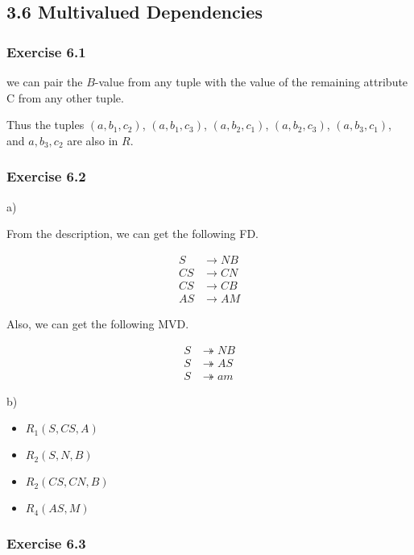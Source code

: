 \documentclass[../../main.tex]{subfiles}
\begin{document}
\subsection*{3.6 Multivalued Dependencies}

\subsubsection*{Exercise 6.1}

we can pair the $B$-value from any tuple with the
value of the remaining attribute C from any other
tuple.

Thus the tuples $(a, b_{1}, c_{2})$, $(a, b_{1}, c_{3})$,
$(a, b_{2}, c_{1})$, $(a, b_{2}, c_{3})$, $(a, b_{3}, c_{1})$,
and $a, b_{3}, c_{2}$ are also in $R$.

\subsubsection*{Exercise 6.2}

a)

From the description, we can get the following FD.

\begin{align*}
  S & \to NB \\
  CS & \to CN \\
  CS & \to CB \\
  AS & \to AM
\end{align*}

Also, we can get the following MVD.

\begin{align*}
  S & \twoheadrightarrow NB \\
  S & \twoheadrightarrow AS \\
  S & \twoheadrightarrow am
\end{align*}

b)

\begin{itemize}
  \item $R_{1}(S, CS, A)$
  \item $R_{2}(S,N,B)$
  \item $R_{2}(CS,CN,B)$
  \item $R_{4}(AS, M)$
\end{itemize}

\subsubsection*{Exercise 6.3}
\end{document}
